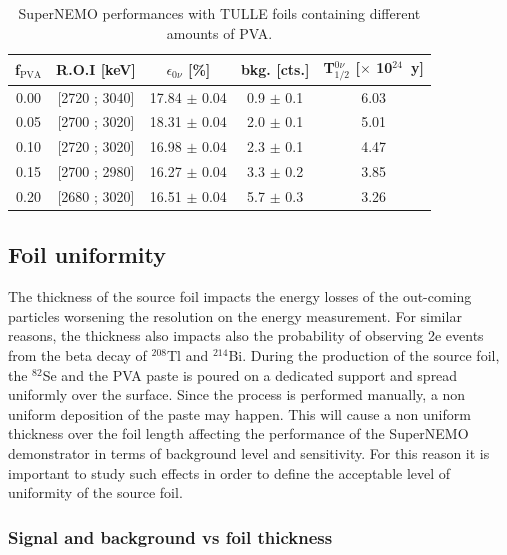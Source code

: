 \documentclass[main.tex]{subfiles}
\begin{document}
\begin{table}[h!]
\centering
\begin{tabular}{c|c|c|c|c}
\toprule
f$_{\text{PVA}}$ & R.O.I [keV] & $\epsilon_{\text{0}\nu}$ [\%] & bkg. [cts.] &   T$_{\text{1/2}}^{\text{0}\nu}$ [$\times$ 10$^{\text{24}}$~y] \\[0.1cm]
\hline
0.00 & [2720 ; 3040] & 17.84 $\pm$ 0.04 & 0.9 $\pm$ 0.1 & 6.03 \\ [0.1cm]
\hline
0.05 & [2700 ; 3020] & 18.31 $\pm$ 0.04 & 2.0 $\pm$ 0.1 & 5.01 \\ [0.1cm]
\hline
0.10 & [2720 ; 3020] & 16.98 $\pm$ 0.04 & 2.3 $\pm$ 0.1 & 4.47 \\ [0.1cm]
\hline
0.15 & [2700 ; 2980] & 16.27 $\pm$ 0.04 & 3.3 $\pm$ 0.2 & 3.85 \\ [0.1cm]
\hline
0.20 & [2680 ; 3020] & 16.51 $\pm$ 0.04 & 5.7 $\pm$ 0.3 & 3.26 \\ [0.1cm]
\bottomrule
\end{tabular}
\caption{SuperNEMO performances with TULLE foils containing different amounts of PVA.}
\label{Tab:AmountOfPVA}
\end{table}


\FloatBarrier


\subsection{Foil uniformity}\label{sec:FoilUniformity}


\NI The thickness of the source foil impacts the energy losses of the out-coming particles worsening the resolution on the energy measurement. For similar reasons, the thickness also impacts also the probability of observing 2e events from the beta decay of $^{\text{208}}$Tl and $^{\text{214}}$Bi. During the production of the source foil, the $^{\text{82}}$Se and the PVA paste is poured on a dedicated support and spread uniformly over the surface. Since the process is performed manually, a non uniform deposition of the paste may happen. This will cause a non uniform thickness over the foil length affecting the performance of the SuperNEMO demonstrator in terms of background level and sensitivity. For this reason it is important to study such effects in order to define the acceptable level of uniformity of the source foil.


\subsubsection{Signal and background vs foil thickness}
\end{document}
